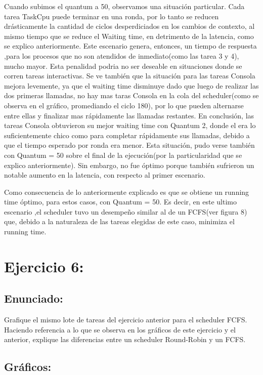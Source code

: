 \documentclass[10pt, a4paper]{article}
\begin{document}
Cuando subimos el quantum a 50, observamos una situación particular. Cada tarea TaskCpu puede terminar en una ronda, por lo tanto se reducen drásticamente la cantidad de ciclos desperdiciados en los cambios de contexto, al mismo tiempo que se reduce el Waiting time, en detrimento de la latencia, como se explico anteriormente. Este escenario genera, entonces, un tiempo de respuesta ,para los procesos que no son atendidos de inmediato(como las tarea 3 y 4), mucho mayor. Esta penalidad podria no ser deseable en situaciones donde se corren tareas interactivas.
Se ve también que la situación para las tareas Consola mejora levemente, ya que el waiting time disminuye dado que luego de realizar las dos primeras llamadas, no hay mas taras Consola en la cola del scheduler(como se observa en el gráfico, promediando el ciclo 180), por lo que pueden alternarse entre ellas y finalizar mas rápidamente las llamadas restantes.
En conclusión, las tareas Consola obtuvieron su mejor waiting time con Quantum 2, donde el era lo suficientemente chico como para completar rápidamente sus llamadas, debido a que el tiempo esperado por ronda era menor. Esta situación, pudo verse también con Quantum = 50 sobre el final de la ejecución(por la particularidad que se explico anteriormente). Sin embargo, no fue óptimo porque también sufrieron un notable aumento en la latencia, con respecto al primer escenario.


Como consecuencia de lo anteriormente explicado es que se obtiene un running time óptimo, para estos casos, con Quantum = 50.
Es decir, en este ultimo escenario ,el scheduler tuvo un desempeño similar al de un FCFS(ver figura 8) que, debido a la naturaleza de las tareas elegidas de este caso, minimiza el running time.


\section{Ejercicio 6:}
	
\subsection{Enunciado:}
Grafique el mismo lote de tareas del ejercicio anterior para el scheduler FCFS.
Haciendo referencia a lo que se observa en los gráficos de este ejercicio y el anterior, explique las diferencias entre un scheduler Round-Robin y un FCFS.

\subsection{Gráficos:}
\end{document}
